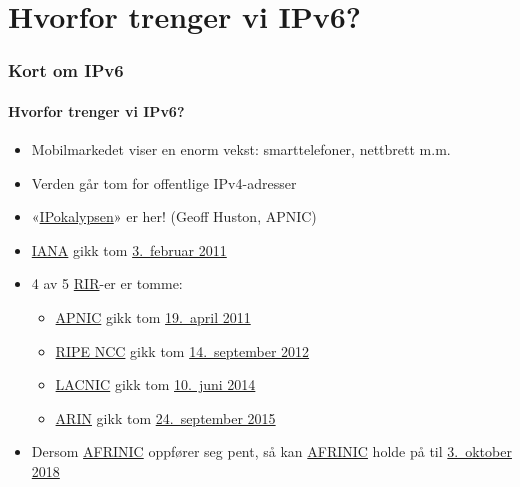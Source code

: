 \section{Hvorfor trenger vi IPv6?}
\begin{frame}
  \frametitle{Kort om IPv6}
  \framesubtitle{Hvorfor trenger vi IPv6?}
  \begin{itemize}
  \item Mobilmarkedet viser en enorm vekst: smarttelefoner, nettbrett m.m.
  \item Verden går tom for offentlige IPv4-adresser
  \item
    «\href{http://www.potaroo.net/presentations/2012-05-22-terena.pdf}{IPokalypsen}»
    er her! (Geoff Huston, APNIC)
  \item \href{http://www.iana.org/}{IANA} gikk tom
    \href{http://www.icann.org/en/news/press/releases/release-03feb11-en.pdf}{3.~februar
      2011}
  \item 4 av 5
    \href{http://en.wikipedia.org/wiki/Regional_Internet_registry}{RIR}-er
    er tomme:
    \begin{itemize}
    \item \href{http://www.apnic.net/}{APNIC} gikk tom
      \href{http://www.apnic.net/community/ipv4-exhaustion/graphical-information}{19.~april
        2011}
    \item \href{http://www.ripe.net/}{RIPE NCC} gikk tom
      \href{http://www.ripe.net/internet-coordination/ipv4-exhaustion}{14.~september
        2012}
    \item \href{http://www.lacnic.net/en/web/lacnic/inicio}{LACNIC}
      gikk tom
      \href{http://www.lacnic.net/en/web/lacnic/agotamiento-ipv4}{10.~juni
        2014}
    \item \href{https://www.arin.net/}{ARIN} gikk tom
      \href{https://www.arin.net/announcements/2015/20150924.html}{24.~september
        2015}
    \end{itemize}
  \item Dersom \href{http://www.afrinic.net/}{AFRINIC} oppfører seg
    pent, så kan
    \href{http://afrinic.net/en/community/ipv4-exhaustion}{AFRINIC}
    holde på til \href{http://www.potaroo.net/tools/ipv4/}{3.\ oktober
      2018}
  \end{itemize}
\end{frame}

